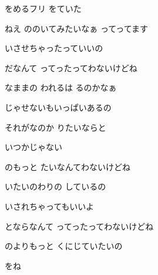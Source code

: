\documentclass[14pt]{ltjsarticle}
\begin{document}
{\item
  をめるフリ をていた
  \jisho{}

  ねえ ののいてみたいなぁ ってってます
  \jisho{}

\item
  いさせちゃったっていいの
  \jisho{}

  だなんて ってったってわないけどね
  \jisho{}

  なままの われるは るのかなぁ
  \jisho{}

\item
  じゃせないもいっぱいあるの
  \jisho{}

  それがなのか りたいならと
  \jisho{}

\item
  いつかじゃない
  \jisho{}

  のもっと たいなんてわないけどね
  \jisho{}

  いたいのわりの しているの
  \jisho{}

\item
  いされちゃってもいいよ
  \jisho{}

  とならなんて ってったってわないけどね
  \jisho{}

  のよりもっと くにじていたいの
  \jisho{}

  をね
  \jisho{}

}
\end{document}
